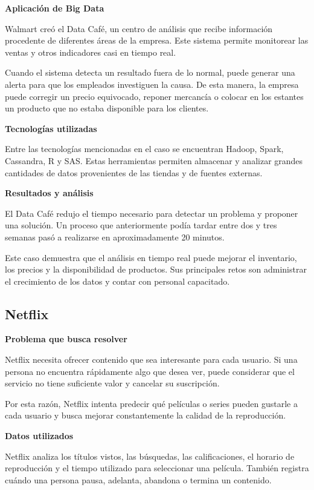 \textbf{Aplicación de Big Data}

Walmart creó el Data Café, un centro de análisis que recibe información procedente de diferentes áreas de la empresa. Este sistema permite monitorear las ventas y otros indicadores casi en tiempo real.

Cuando el sistema detecta un resultado fuera de lo normal, puede generar una alerta para que los empleados investiguen la causa. De esta manera, la empresa puede corregir un precio equivocado, reponer mercancía o colocar en los estantes un producto que no estaba disponible para los clientes.

\textbf{Tecnologías utilizadas}

Entre las tecnologías mencionadas en el caso se encuentran Hadoop, Spark, Cassandra, R y SAS. Estas herramientas permiten almacenar y analizar grandes cantidades de datos provenientes de las tiendas y de fuentes externas.

\textbf{Resultados y análisis}

El Data Café redujo el tiempo necesario para detectar un problema y proponer una solución. Un proceso que anteriormente podía tardar entre dos y tres semanas pasó a realizarse en aproximadamente 20 minutos.

Este caso demuestra que el análisis en tiempo real puede mejorar el inventario, los precios y la disponibilidad de productos. Sus principales retos son administrar el crecimiento de los datos y contar con personal capacitado.

\subsection{Netflix}

\textbf{Problema que busca resolver}

Netflix necesita ofrecer contenido que sea interesante para cada usuario. Si una persona no encuentra rápidamente algo que desea ver, puede considerar que el servicio no tiene suficiente valor y cancelar su suscripción.

Por esta razón, Netflix intenta predecir qué películas o series pueden gustarle a cada usuario y busca mejorar constantemente la calidad de la reproducción.

\textbf{Datos utilizados}

Netflix analiza los títulos vistos, las búsquedas, las calificaciones, el horario de reproducción y el tiempo utilizado para seleccionar una película. También registra cuándo una persona pausa, adelanta, abandona o termina un contenido.

